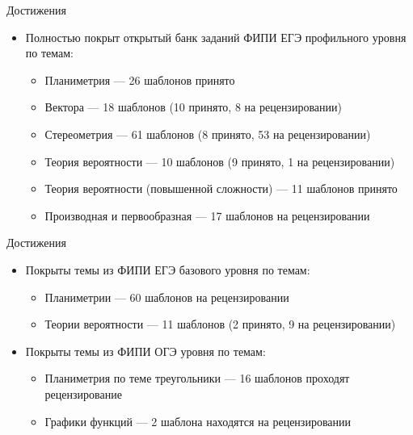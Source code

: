 \documentclass[aspectratio=169,12pt]{beamer}
\begin{document}
\begin{frame}{Достижения}
	\begin{itemize}
		\item Полностью покрыт открытый банк заданий ФИПИ ЕГЭ профильного уровня по темам:
		      \begin{itemize}
			      \item Планиметрия — 26 шаблонов принято
			      \item Вектора — 18 шаблонов (10 принято, 8 на рецензировании)
			      \item Стереометрия — 61 шаблонов (8 принято, 53 на рецензировании)
			      \item Теория вероятности — 10 шаблонов (9 принято, 1  на рецензировании)
			      \item Теория вероятности (повышенной сложности) — 11 шаблонов принято
			      \item Производная и первообразная — 17 шаблонов на рецензировании
		      \end{itemize}
	\end{itemize}
\end{frame}

\begin{frame}{Достижения}
	\begin{itemize}
		\item Покрыты темы из ФИПИ ЕГЭ базового уровня по темам:
		      \begin{itemize}
			      \item Планиметрии — 60 шаблонов на рецензировании
			      \item Теории вероятности — 11 шаблонов (2  принято, 9 на рецензировании)
		      \end{itemize}
		\item Покрыты темы из ФИПИ ОГЭ уровня по темам:
		\begin{itemize}
			\item Планиметрия по теме треугольники — 16 шаблонов проходят рецензирование
			\item Графики функций — 2 шаблона находятся на рецензировании
		\end{itemize}
	\end{itemize}
\end{frame}
\end{document}
